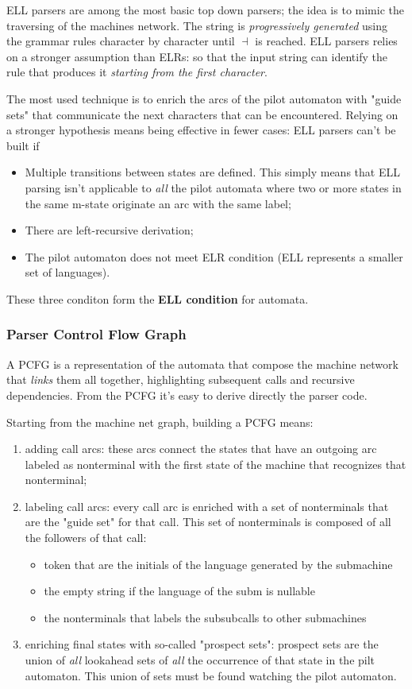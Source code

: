			ELL parsers are among the most basic top down parsers; the idea is to mimic the traversing of the machines network. The string is 
			\emph{progressively generated} using the grammar rules character by character until $\dashv$ is reached. ELL parsers relies on a stronger assumption 
			than ELRs: so that the input string can identify the rule that produces it \emph{starting from the first character}.

			The most used technique is to enrich the arcs of the pilot automaton with "guide sets" that communicate the next characters that can be encountered. 
			Relying on a stronger hypothesis means being effective in fewer cases: ELL parsers can't be built if
			\begin{itemize}
				\item Multiple transitions between states are defined. This simply means that ELL parsing isn't applicable to \emph{all} the pilot automata where 
				two or more states in the same m-state originate an arc with the same label;
				\item There are left-recursive derivation;
				\item The pilot automaton does not meet ELR condition (ELL represents a smaller set of languages). 
			\end{itemize}
			These three conditon form the \textbf{ELL condition} for automata.
			
			\subsubsection{Parser Control Flow Graph}
				A PCFG is a representation of the automata that compose the machine network that \emph{links} them all together, highlighting subsequent calls 
				and recursive dependencies. From the PCFG it's easy to derive directly the parser code.

				Starting from the machine net graph, building a PCFG means:
				\begin{enumerate}
					\item adding call arcs: these arcs connect the states that have an outgoing arc labeled as nonterminal with the first state of the machine that 
					recognizes that nonterminal;
					\item labeling call arcs: every call arc is enriched with a set of nonterminals that are the "guide set" for that call. This set of nonterminals 
					is composed of all the followers of that call:
						\begin{itemize}
							\item token that are the initials of the language generated by the submachine
							\item the empty string if the language of the subm is nullable
							\item the nonterminals that labels the subsubcalls to other submachines
						\end{itemize}
					\item enriching final states with so-called "prospect sets": prospect sets are the union of \emph{all} lookahead sets of \emph{all} the 
					occurrence of that state in the pilt automaton. This union of sets must be found watching the pilot automaton. 
				\end{enumerate}
				
